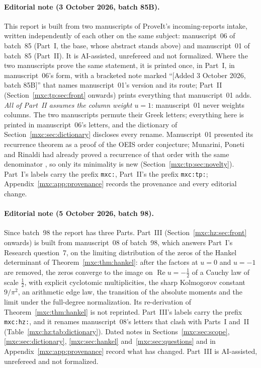 \documentclass[11pt]{article}
\numberwithin{equation}{section}
\theoremstyle{definition}
\theoremstyle{remark}
\begin{document}
\paragraph{Editorial note (3 October 2026, batch 85B).}
This report is built from two manuscripts of ProveIt's incoming-reports
intake, written independently of each other on the same subject:
manuscript~06 of batch~85 (Part~I, the base, whose abstract stands above)
and manuscript~01 of batch~85 (Part~II). It is AI-assisted, unrefereed and
not formalized. Where the two manuscripts prove the same statement, it is
printed once, in Part~I, in manuscript~06's form, with a bracketed note
marked ``[Added 3 October 2026, batch 85B]'' that names manuscript~01's
version and its route; Part~II (Section~\ref{mxc:tp:sec:front} onwards)
prints everything that manuscript~01 adds. \emph{All of Part~II assumes
the column weight $u=1$}: manuscript~01 never weights columns.
The two manuscripts permute their Greek letters; everything here is
printed in manuscript~06's letters, and the dictionary of
Section~\ref{mxc:sec:dictionary} discloses every rename. Manuscript~01
presented its recurrence theorem as a proof of the OEIS order conjecture;
Munarini, Poneti and Rinaldi had already proved a recurrence of that order
with the same denominator \cite[Proposition~25 and Remark~26,
p.~16]{mpr2009}, so only its minimality is new
(Section~\ref{mxc:tp:sec:novelty}). Part~I's labels carry the prefix
\texttt{mxc:}, Part~II's the prefix \texttt{mxc:tp:}; Appendix~\ref{mxc:app:provenance}
records the provenance and every editorial change.

\paragraph{Editorial note (5 October 2026, batch 98).}
Since batch~98 the report has three Parts. Part~III
(Section~\ref{mxc:hz:sec:front} onwards) is built from manuscript~08 of
batch~98, which answers Part~I's Research question~7, on the limiting
distribution of the zeros of the Hankel determinant of
Theorem~\ref{mxc:thm:hankel}: after the factors at $u=0$ and $u=-1$ are
removed, the zeros converge to the image on $\operatorname{Re}u=-\frac12$
of a Cauchy law of scale $\frac12$, with explicit cyclotomic multiplicities,
the sharp Kolmogorov constant $9/\pi^2$, an arithmetic edge law, the
transition of the absolute moments and the limit under the full-degree
normalization. Its re-derivation of Theorem~\ref{mxc:thm:hankel} is not
reprinted. Part~III's labels carry the prefix \texttt{mxc:hz:}, and it
renames manuscript~08's letters that clash with Parts~I and~II
(Table~\ref{mxc:hz:tab:dictionary}). Dated notes in
Sections~\ref{mxc:sec:scope}, \ref{mxc:sec:dictionary}, \ref{mxc:sec:hankel}
and~\ref{mxc:sec:questions} and in Appendix~\ref{mxc:app:provenance} record
what has changed. Part~III is AI-assisted, unrefereed and not formalized.
\end{document}
